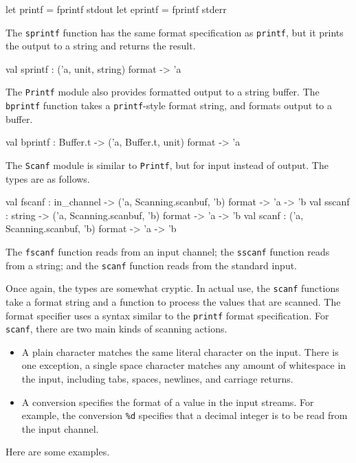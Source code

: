 \begin{ocaml}
let printf = fprintf stdout
let eprintf = fprintf stderr
\end{ocaml}
%
The \hbox{\lstinline$sprintf$} function has the same format specification
as \hbox{\lstinline$printf$}, but it prints the output to a string and returns the result.

\begin{ocaml}
val sprintf : ('a, unit, string) format -> 'a
\end{ocaml}
%
The \hbox{\lstinline$Printf$} module also provides formatted output to a string
buffer. The \hbox{\lstinline$bprintf$} function takes a \hbox{\lstinline$printf$}-style format
string, and formats output to a buffer.

\begin{ocaml}
val bprintf : Buffer.t -> ('a, Buffer.t, unit) format -> 'a
\end{ocaml}

%

The \hbox{\lstinline+Scanf+} module is similar to \hbox{\lstinline+Printf+}, but for input instead
of output.  The types are as follows.

\begin{ocaml}
val fscanf : in_channel -> ('a, Scanning.scanbuf, 'b) format -> 'a -> 'b
val sscanf : string -> ('a, Scanning.scanbuf, 'b) format -> 'a -> 'b
val scanf  : ('a, Scanning.scanbuf, 'b) format -> 'a -> 'b
\end{ocaml}
%
The \hbox{\lstinline+fscanf+} function reads from an input channel; the
\hbox{\lstinline+sscanf+} function reads from a string; and the \hbox{\lstinline+scanf+}
function reads from the standard input.

Once again, the types are somewhat cryptic.  In actual use, the \hbox{\lstinline+scanf+} functions
take a format string and a function to process the values that are scanned.  The format specifier
uses a syntax similar to the \hbox{\lstinline+printf+} format specification.  For \hbox{\lstinline+scanf+},
there are two main kinds of scanning actions.

\begin{itemize}
\item 

A plain character matches the same literal character on the input.  There is one exception, a single
space character matches any amount of whitespace in the input, including tabs, spaces, newlines, and
carriage returns.

\item

A conversion specifies the format of a value in the input streams.
For example, the conversion \hbox{\lstinline+%d+} specifies that
a decimal integer is to be read from the input channel.

\end{itemize}
%
Here are some examples.

